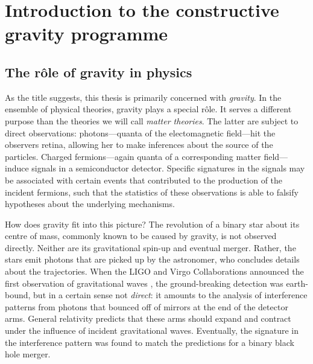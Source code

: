 \chapter{Introduction to the constructive gravity programme}

\section{The r\^ole of gravity in physics}
As the title suggests, this thesis is primarily concerned with \emph{gravity}. In the ensemble of physical theories, gravity plays a special r\^ole. It serves a different purpose than the theories we will call \emph{matter theories}. The latter are subject to direct observations: photons---quanta of the electomagnetic field---hit the observers retina, allowing her to make inferences about the source of the particles. Charged fermions---again quanta of a corresponding matter field---induce signals in a semiconductor detector. Specific signatures in the signals may be associated with certain events that contributed to the production of the incident fermions, such that the statistics of these observations is able to falsify hypotheses about the underlying mechanisms.

How does gravity fit into this picture? The revolution of a binary star about its centre of mass, commonly known to be caused by gravity, is not observed directly. Neither are its gravitational spin-up and eventual merger. Rather, the stars emit photons that are picked up by the astronomer, who concludes details about the trajectories. When the LIGO and Virgo Collaborations announced the first observation of gravitational waves \cite{ligo}, the ground-breaking detection was earth-bound, but in a certain sense not \emph{direct}: it amounts to the analysis of interference patterns from photons that bounced off of mirrors at the end of the detector arms. General relativity predicts that these arms should expand and contract under the influence of incident gravitational waves. Eventually, the signature in the interference pattern was found to match the predictions for a binary black hole merger.

